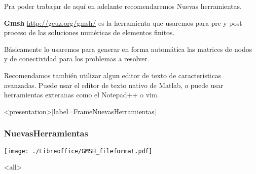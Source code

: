 
Pra poder trabajar de aquí en adelante recomendaremos 
Nuevas herramientas. 

\textbf{Gmsh} \url{http://geuz.org/gmsh/} es la herramienta
que usaremos para pre y post proceso de las soluciones numéricas
de elementos finitos.

Básicamente lo usaremos para generar en forma automática las 
matrices de nodos y de conectividad para los problemas a 
resolver. 

Recomendamos también utilizar algun editor de texto de 
características avanzadas. Puede usar el editor de texto 
nativo de Matlab, o puede usar herramientas exteranas como 
el Notepad++ o vim. 

\mode*
\begin{frame}<presentation>[label=FrameNuevasHerramientas]
  \frametitle{NuevasHerramientas}
  \texttt{[image: ./Libreoffice/GMSH\_fileformat.pdf]}

\end{frame}

\mode<all>
